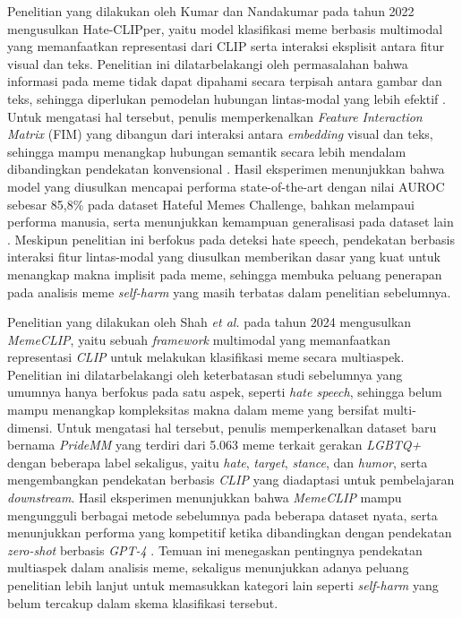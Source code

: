 Penelitian yang dilakukan oleh Kumar dan Nandakumar pada tahun 2022 mengusulkan Hate-CLIPper, yaitu model klasifikasi meme berbasis multimodal yang memanfaatkan representasi dari CLIP serta interaksi eksplisit antara fitur visual dan teks. Penelitian ini dilatarbelakangi oleh permasalahan bahwa informasi pada meme tidak dapat dipahami secara terpisah antara gambar dan teks, sehingga diperlukan pemodelan hubungan lintas-modal yang lebih efektif . Untuk mengatasi hal tersebut, penulis memperkenalkan \textit{Feature Interaction Matrix} (FIM) yang dibangun dari interaksi antara \textit{embedding}  visual dan teks, sehingga mampu menangkap hubungan semantik secara lebih mendalam dibandingkan pendekatan konvensional . Hasil eksperimen menunjukkan bahwa model yang diusulkan mencapai performa state-of-the-art dengan nilai AUROC sebesar 85{,}8\% pada dataset Hateful Memes Challenge, bahkan melampaui performa manusia, serta menunjukkan kemampuan generalisasi pada dataset lain \cite{kumar2022hateclipper}. Meskipun penelitian ini berfokus pada deteksi hate speech, pendekatan berbasis interaksi fitur lintas-modal yang diusulkan memberikan dasar yang kuat untuk menangkap makna implisit pada meme, sehingga membuka peluang penerapan pada analisis meme \textit{self-harm} yang masih terbatas dalam penelitian sebelumnya.

Penelitian yang dilakukan oleh Shah \textit{et al.} pada tahun 2024 mengusulkan \textit{MemeCLIP}, yaitu sebuah \textit{framework} multimodal yang memanfaatkan representasi \textit{CLIP} untuk melakukan klasifikasi meme secara multiaspek. Penelitian ini dilatarbelakangi oleh keterbatasan studi sebelumnya yang umumnya hanya berfokus pada satu aspek, seperti \textit{hate speech}, sehingga belum mampu menangkap kompleksitas makna dalam meme yang bersifat multi-dimensi. Untuk mengatasi hal tersebut, penulis memperkenalkan dataset baru bernama \textit{PrideMM} yang terdiri dari 5.063 meme terkait gerakan \textit{LGBTQ+} dengan beberapa label sekaligus, yaitu \textit{hate}, \textit{target}, \textit{stance}, dan \textit{humor}, serta mengembangkan pendekatan berbasis \textit{CLIP} yang diadaptasi untuk pembelajaran \textit{downstream}. Hasil eksperimen menunjukkan bahwa \textit{MemeCLIP} mampu mengungguli berbagai metode sebelumnya pada beberapa dataset nyata, serta menunjukkan performa yang kompetitif ketika dibandingkan dengan pendekatan \textit{zero-shot} berbasis \textit{GPT-4} \cite{shah2024memeclip}. Temuan ini menegaskan pentingnya pendekatan multiaspek dalam analisis meme, sekaligus menunjukkan adanya peluang penelitian lebih lanjut untuk memasukkan kategori lain seperti \textit{self-harm} yang belum tercakup dalam skema klasifikasi tersebut.

